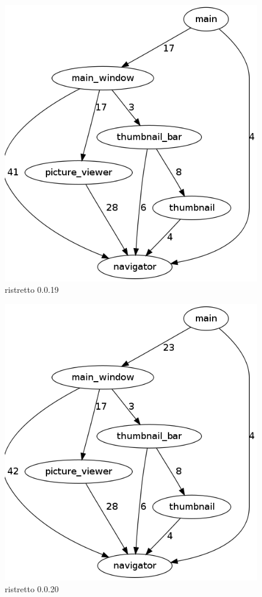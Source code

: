 \begin{figure}[h]
\center
\includegraphics[scale=0.4]{imagens/ristretto-0_0_19-doxyparse-2}
\caption{ristretto 0.0.19}
\label{fig:ristretto-0.0.19-doxyparse-2-anexo}
\end{figure}

\begin{figure}[h]
\center
\includegraphics[scale=0.4]{imagens/ristretto-0_0_20-doxyparse-2}
\caption{ristretto 0.0.20}
\label{fig:ristretto-0.0.20-doxyparse-2-anexo}
\end{figure}

